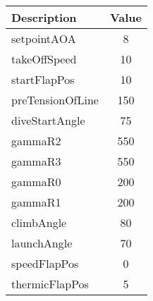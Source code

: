        \begin{center}

            \begin{tabular}{|l|c|}

               \hline

Description & Value  \\ \hline \hline 

setpointAOA & 8 \\ \hline 

takeOffSpeed & 10 \\ \hline 

startFlapPos & 10 \\ \hline 

preTensionOfLine & 150 \\ \hline 

diveStartAngle & 75 \\ \hline 

gammaR2 & 550 \\ \hline 

gammaR3 & 550 \\ \hline 

gammaR0 & 200 \\ \hline 

gammaR1 & 200 \\ \hline 

climbAngle & 80 \\ \hline 

launchAngle & 70 \\ \hline 

speedFlapPos & 0 \\ \hline 

thermicFlapPos & 5 \\ \hline 

            \end{tabular}

        \end{center}

